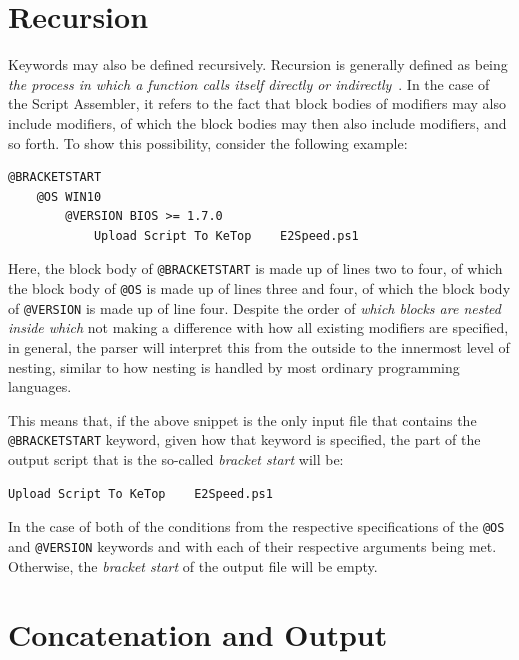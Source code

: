 \section{Recursion}

Keywords may also be defined recursively. Recursion is generally defined as being \textit{the process in which a function calls itself directly or indirectly}~\cite{recursion}. In the case of the Script Assembler, it refers to the fact that block bodies of modifiers may also include modifiers, of which the block bodies may then also include modifiers, and so forth. To show this possibility, consider the following example:

\begin{lstlisting}[caption={Example of modifiers being defined recursively.}, label={lst:recursive_modifier_example}]
@BRACKETSTART
    @OS WIN10
        @VERSION BIOS >= 1.7.0
            Upload Script To KeTop    E2Speed.ps1
\end{lstlisting}

Here, the block body of \verb|@BRACKETSTART| is made up of lines two to four, of which the block body of \verb|@OS| is made up of lines three and four, of which the block body of \verb|@VERSION| is made up of line four. Despite the order of \textit{which blocks are nested inside which} not making a difference with how all existing modifiers are specified, in general, the parser will interpret this from the outside to the innermost level of nesting, similar to how nesting is handled by most ordinary programming languages. 

This means that, if the above snippet is the only input file that contains the \verb|@BRACKETSTART| keyword, given how that keyword is specified, the part of the output script that is the so-called \textit{bracket start} will be: 

\begin{lstlisting}[caption={Bracket-start parser result for Listing~\ref{lst:recursive_modifier_example} for satisfied conditions.}, label={lst:bracket_start_output_example}]
Upload Script To KeTop    E2Speed.ps1
\end{lstlisting}

In the case of both of the conditions from the respective specifications of the \verb|@OS| and \verb|@VERSION| keywords and with each of their respective arguments being met. Otherwise, the \textit{bracket start} of the output file will be empty. 

\section{Concatenation and Output}

